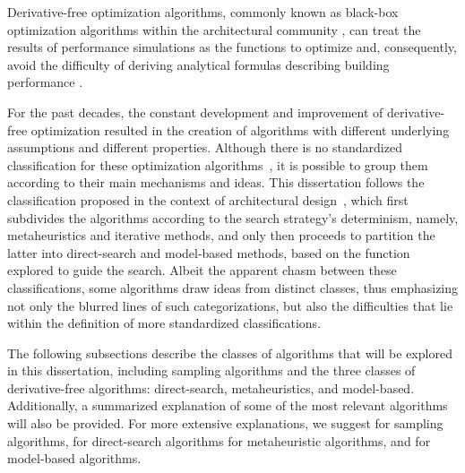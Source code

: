	Derivative-free optimization algorithms, commonly known as black-box optimization algorithms within the architectural community \cite{Wortmann2016BBO}, %
	can treat the results of performance simulations as the functions to optimize and, consequently, avoid the difficulty of deriving analytical formulas describing building performance \cite{Machairas2014}.
	
	For the past decades, the constant development and improvement of derivative-free optimization resulted in the creation of algorithms with different underlying assumptions and different properties. Although there is no standardized classification for these optimization algorithms~\cite{Rios2013, Wortmann2017ADO}, it is possible to group them according to their main mechanisms and ideas. This dissertation follows the classification proposed in the context of architectural design~\cite{Wortmann2015AdvSBO}, which first subdivides the algorithms according to the search strategy's determinism, namely, metaheuristics and iterative methods, and only then proceeds to partition the latter into direct-search and model-based methods, based on the function explored to guide the search. Albeit the apparent chasm between these classifications, some algorithms draw ideas from distinct classes, thus emphasizing not only the blurred lines of such categorizations, but also the difficulties that lie within the definition of more standardized classifications. 
	
	The following subsections describe the classes of algorithms that will be explored in this dissertation, including sampling algorithms and the three classes of derivative-free algorithms: direct-search, metaheuristics, and model-based. Additionally, a summarized explanation of some of the most relevant algorithms will also be provided. For more extensive explanations, we suggest \cite{Tille2006} for sampling algorithms, \cite{Conn2009} for direct-search algorithms \cite{BlumRoli2003Metaheuristics, Glover2003Metaheuristics, Zhou2011} for metaheuristic algorithms, and \cite{Koziel2011} for model-based algorithms.
	

